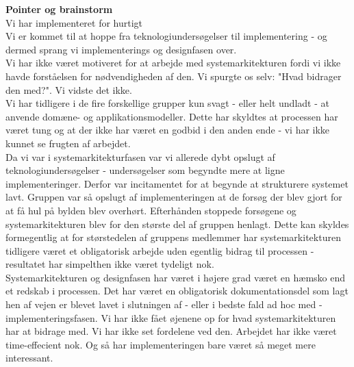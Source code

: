 \textbf{Pointer og brainstorm}\\
Vi har implementeret for hurtigt\\
Vi er kommet til at hoppe fra teknologiundersøgelser til implementering - og dermed sprang vi implementerings og designfasen over.\\
Vi har ikke været motiveret for at arbejde med systemarkitekturen fordi vi ikke havde forståelsen for nødvendigheden af den. Vi spurgte os selv: "Hvad bidrager den med?". Vi vidste det ikke.\\
Vi har tidligere i de fire forskellige grupper kun svagt - eller helt undladt - at anvende domæne- og applikationsmodeller. Dette har skyldtes at processen har været tung og at der ikke har været en godbid i den anden ende - vi har ikke kunnet se frugten af arbejdet.\\
Da vi var i systemarkitekturfasen var vi allerede dybt opslugt af teknologiundersøgelser - undersøgelser som begyndte mere at ligne implementeringer. Derfor var incitamentet for at begynde at strukturere systemet lavt. Gruppen var så opslugt af implementeringen at de forsøg der blev gjort for at få hul på bylden blev overhørt. Efterhånden stoppede forsøgene og systemarkitekturen blev for den største del af gruppen henlagt. Dette kan skyldes formegentlig at for størstedelen af gruppens medlemmer har systemarkitekturen tidligere været et obligatorisk arbejde uden egentlig bidrag til processen - resultatet har simpelthen ikke været tydeligt nok.\\
Systemarkitekturen og designfasen har været i højere grad været en hæmsko end et redskab i processen. Det har været en obligatorisk dokumentationsdel som lagt hen af vejen er blevet lavet i slutningen af - eller i bedste fald ad hoc med - implementeringsfasen. Vi har ikke fået øjenene op for hvad systemarkitekturen har at bidrage med. Vi har ikke set fordelene ved den. Arbejdet har ikke været time-effecient nok. Og så har implementeringen bare været så meget mere interessant.\\

